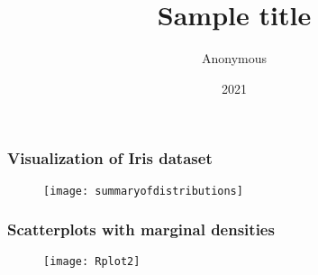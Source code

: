 \documentclass[border=5mm, convert, usenames, dvipsnames,beamer]{standalone}
\title{Sample title}
\author{Anonymous}
\institute{Overleaf}
\date{2021}
\begin{document}
\begin{frame}[ fragile]{}
\frametitle{Visualization of Iris dataset}

\vspace{40}
\noindent

\vspace{-5mm}
\begin{figure}[h!]
\begin{center}
\texttt{[image: summaryofdistributions]}
\end{center}
\end{figure}







\end{frame}







\begin{frame}[ fragile]{}
\frametitle{Scatterplots with marginal densities}

\vspace{40}
\noindent

\vspace{0mm}
\begin{figure}[h!]
\begin{center}
\texttt{[image: Rplot2]}
\end{center}
\end{figure}

\end{frame}
\end{document}
